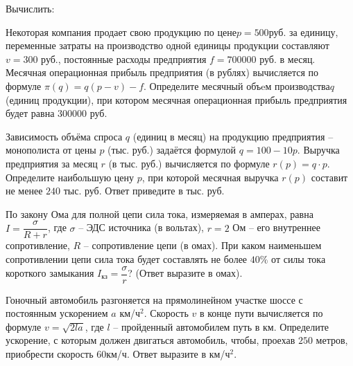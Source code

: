 %
%
\begin{class}[number=1]
\begin{listofex}
	\item Вычислить:
	\begin{enumcols}[itemcolumns=3]
		\item {}
		\item {}
		\item {}
		\item {}
		\item {}
		\item {}
		\item {}
	\end{enumcols}
	\item Некоторая компания продает свою продукцию по цене\(  p=500  \)руб. за единицу, переменные затраты на производство одной единицы продукции составляют  \( v=300 \) руб., постоянные расходы предприятия \( f=700000 \) руб. в месяц. Месячная операционная прибыль предприятия (в рублях) вычисляется по формуле  \( \pi(q)=q(p-v)-f \). Определите месячный объeм производства\(  q \) (единиц продукции), при котором месячная операционная прибыль предприятия будет равна \( 300000 \) руб.
	\item Зависимость объёма спроса \( q \) (единиц в месяц) на продукцию предприятия – монополиста от цены \( p \) (тыс. руб.) задаётся формулой \( q=100-10p \). Выручка предприятия за месяц \( r \) (в тыс. руб.) вычисляется по формуле \( r(p)=q\cdot p \). Определите наибольшую цену \( p \), при которой месячная выручка \( r(p) \) составит не менее \( 240 \) тыс. руб. Ответ приведите в тыс. руб.
	\item По закону Ома для полной цепи сила тока, измеряемая в амперах, равна \( I=\dfrac{\sigma}{R+r} \), где \(\sigma\) – ЭДС источника (в вольтах), \(r=2\) Ом – его внутреннее сопротивление, \(R\) – сопротивление цепи (в омах). При каком наименьшем сопротивлении цепи сила тока будет составлять не более \(40\% \) от силы тока короткого замыкания \( I_{кз} =\dfrac{\sigma}{r}\)? (Ответ выразите в омах).
	\item Гоночный автомобиль разгоняется на прямолинейном участке шоссе с постоянным ускорением \( a \) км/ч\( ^2 \). Скорость \( v \)  в конце пути вычисляется по формуле \( v=\sqrt{2la} \), где \( l \) – пройденный автомобилем путь в км. Определите ускорение, с которым должен двигаться автомобиль, чтобы, проехав \( 250 \) метров, приобрести скорость \( 60 \)км/ч. Ответ выразите в км/ч\( ^2 \).

\end{listofex}
\end{class}

